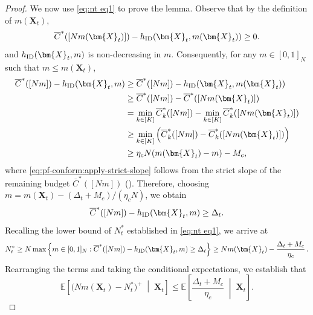 \documentclass{article}
\theoremstyle{plain}
\theoremstyle{remark}
\newcommand{\E}[1]{\mathbb{E}\left[#1\right]}
\newcommand{\givenmiddle}{\;\middle|\;}
\newcommand{\ID}{\textnormal{ID}}
\newcommand{\rembud}{\overline{C}^*} %
\def\mX{{\bm{X}}}
\newcommand{\EE}{\mathbb{E}}
\newcommand{\bracket}[1]{\left(#1\right)}
\newcommand{\mbracket}[1]{\left[#1\right]}
\newcommand{\sets}[1]{\left\{ #1 \right\}}
\begin{document}
\begin{proof}
We now use \eqref{eq:nt eq1} to prove the lemma. 
Observe that by the definition of $m(\mX_t)$, 
\[
    \rembud([Nm(\mX_t)])-h_{\ID}(\mX_t,m(\mX_t)) \geq 0.
\]
and $h_{\ID}(\mX_t,m)$ is non-decreasing in $m$. Consequently, for any $m\in [0,1]_N$ such that $m\leq m(\mX_t)$, 
\begin{align}
    \nonumber
    \rembud([Nm])-h_{\ID}(\mX_t,m) 
    &\geq \rembud([Nm])-h_{\ID}(\mX_t,m(\mX_t)) \\
    \nonumber
    &\geq  \rembud([Nm]) - \rembud([Nm(\mX_t)]) \\\nonumber
    &=\min_{k\in[K]} \rembud_k([Nm])-\min_{k\in[K]} \rembud_k([Nm(\mX_t)])\\\nonumber
    &\geq \min_{k\in[K]} \bracket{\rembud_k([Nm]) - \rembud_k([Nm(\mX_t)])}
    \label{eq:pf-conform:apply-strict-slope}\\
    &\geq \eta_cN(m(\mX_t)-m)-M_c,
\end{align}
where \eqref{eq:pf-conform:apply-strict-slope} follows from the strict slope of the remaining budget $\rembud([Nm])$ (). 
Therefore, choosing $m = m(\mX_t) - (\Delta_t+M_c)/(\eta_c N)$, we obtain
\begin{align*}
   \rembud([Nm])-h_{\ID}(\mX_t,m)\geq \Delta_t.
\end{align*}
Recalling the lower bound of $N_t^*$ established in \eqref{eq:nt eq1}, we arrive at
\begin{align*}
    N_t^*\geq N\max\sets{m\in[0,1]_N: \rembud([Nm])-h_{\ID}(\mX_t,m)\geq\Delta_t} \geq Nm(\mX_t)-\frac{\Delta_t +M_c}{\eta_c}\,.
\end{align*}
Rearranging the terms and taking the conditional expectations, we establish that
\begin{equation}
    \label{eq:pf-conform:bound-in-terms-of-E-delta}
    \E{\big(Nm(\mX_t) - N_t^*\big)^+ \givenmiddle \mX_t} \leq \EE\mbracket{\frac{\Delta_t+M_c}{\eta_c} \givenmiddle \mX_t}. 
\end{equation}



\end{proof}
\end{document}
